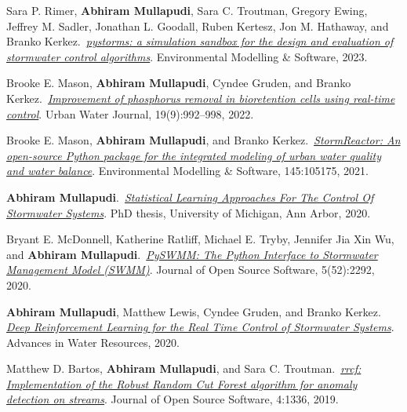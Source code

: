 \documentclass[a4paper,11pt]{article}
\newcommand{\years}[1]{%
  {\reversemarginpar\strut\marginnote{{\small#1}}}%
}
\begin{document}
\years{2023} Sara P. Rimer, \textbf{Abhiram Mullapudi}, Sara C. Troutman, Gregory Ewing, Jeffrey M. Sadler, Jonathan L. Goodall, Ruben Kertesz, Jon M. Hathaway, and Branko Kerkez.\ \href{https://www.sciencedirect.com/science/article/abs/pii/S136481522300021X}{\emph{pystorms: a simulation sandbox for the design and evaluation of stormwater control algorithms}}. Environmental Modelling \& Software, 2023.\\[.1cm]

\years{2022} Brooke E. Mason, \textbf{Abhiram Mullapudi}, Cyndee Gruden, and Branko Kerkez.\ \href{https://www.tandfonline.com/doi/abs/10.1080/1573062X.2022.2108464}{\emph{Improvement of phosphorus removal in bioretention cells using real-time control}}. Urban Water Journal, 19(9):992–998, 2022.\\[.1cm]


\years{2021} Brooke E. Mason, \textbf{Abhiram Mullapudi}, and Branko Kerkez.\ \href{https://www.sciencedirect.com/science/article/abs/pii/S1364815221002176}{\emph{StormReactor: An open-source Python package for the integrated modeling of urban water quality and water balance}}. Environmental Modelling \& Software, 145:105175, 2021.\\[.1cm]


\years{2020} \textbf{Abhiram Mullapudi}.\ \href{https://github.com/abhiramm7/UofM-Doc-Thesis/blob/master/Dissertation_Abhi.pdf}{\emph{Statistical Learning Approaches For The Control Of Stormwater Systems}}. PhD thesis, University of Michigan, Ann Arbor, 2020.\\[.1cm]


\years{2020}  Bryant E. McDonnell, Katherine Ratliff, Michael E. Tryby, Jennifer Jia Xin Wu,
and \textbf{Abhiram Mullapudi}.\ \href{https://joss.theoj.org/papers/10.21105/joss.02292.pdf}{\emph{PySWMM: The Python Interface to Stormwater Management Model (SWMM)}}. Journal of Open Source Software, 5(52):2292, 2020.\\[.1cm]


\years{2020}  \textbf{Abhiram Mullapudi}, Matthew Lewis, Cyndee Gruden, and Branko Kerkez.
\href{http://www.sciencedirect.com/science/article/pii/S0309170820302499}{\emph{Deep Reinforcement Learning for the Real Time Control of Stormwater Systems}}. Advances in Water Resources, 2020.\\[.1cm]


\years{2019} Matthew D. Bartos, \textbf{Abhiram Mullapudi}, and Sara C. Troutman.\ \href{https://joss.theoj.org/papers/10.21105/joss.01336}{\emph{rrcf: Implementation of the Robust Random Cut Forest algorithm for anomaly detection on streams}}. Journal of Open Source Software, 4:1336, 2019.\\[.1cm]
\end{document}
